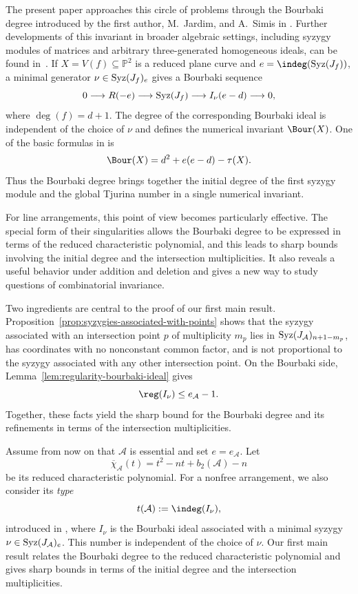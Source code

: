 \documentclass[11pt]{amsart}   %
\theoremstyle{definition}
\def\syz{\mbox{\rm Syz}}
\def\NZQ{\mathbb}               %
\def\PP{{\NZQ P}}
\def\A{{\mathcal A}}
\begin{document}
The present paper approaches this circle of problems through the Bourbaki degree introduced by the first author, M.~Jardim, and A.~Simis in \cite{JNSBourbaki}. Further developments of this invariant in broader algebraic settings, including syzygy modules of matrices and arbitrary three-generated homogeneous ideals, can be found in~\cite{JMN-matrices,JMN-R-three-generated}. If $X=V(f)\subseteq\PP^2$ is a reduced
plane curve and $e=\indeg(\syz(J_f))$, a minimal generator
$\nu\in\syz(J_f)_e$ gives a Bourbaki sequence
\[
0\longrightarrow R(-e)\longrightarrow\syz(J_f)
\longrightarrow I_\nu(e-d)\longrightarrow0,
\]
where $\deg(f)=d+1$. The degree of the corresponding Bourbaki ideal is
independent of the choice of $\nu$ and defines the numerical invariant
$\Bour(X)$. One of the basic formulas
in \cite{JNSBourbaki} is
\[
\Bour(X)=d^2+e(e-d)-\tau(X).
\]
Thus the Bourbaki degree brings together the initial degree of the
first syzygy module and the global Tjurina number in a single
numerical invariant.

For line arrangements, this point of view becomes particularly
effective. The special form of their singularities allows the
Bourbaki degree to be expressed in terms of the reduced characteristic
polynomial, and this leads to sharp bounds involving the initial degree
and the intersection multiplicities. It also reveals a useful behavior
under addition and deletion and gives a new way to study questions of
combinatorial invariance.

Two ingredients are central to the proof of our first main result.
Proposition~\ref{prop:syzygies-associated-with-points} shows that the
syzygy associated with an intersection point $p$ of multiplicity
$m_p$ lies in $\syz(J_\A)_{n+1-m_p}$, has coordinates with no
nonconstant common factor, and is not proportional to the syzygy
associated with any other intersection point. On the Bourbaki side,
Lemma~\ref{lem:regularity-bourbaki-ideal} gives
\[
\reg(I_\nu)\leq e_\A-1.
\]
Together, these facts yield the sharp bound for the Bourbaki degree
and its refinements in terms of the intersection multiplicities.


Assume from now on that $\A$ is essential and set $e=e_\A$. Let
\[
\overline{\chi}_\A(t)=t^2-nt+b_2(\A)-n
\]
be its reduced characteristic polynomial. For a nonfree arrangement,
we also consider its \emph{type}
\[
t(\A):=\indeg(I_\nu),
\]
introduced in
\cite[Definition~1.2 and formula~(1.8)]{Abe-Dimca-Pokora-hierarchy},
where $I_\nu$ is the Bourbaki ideal associated with a minimal syzygy
$\nu\in\syz(J_\A)_e$. This number is independent of the choice of
$\nu$. Our first main result relates the Bourbaki degree to the reduced
characteristic polynomial and gives sharp bounds in terms of the
initial degree and the intersection multiplicities.
\end{document}
